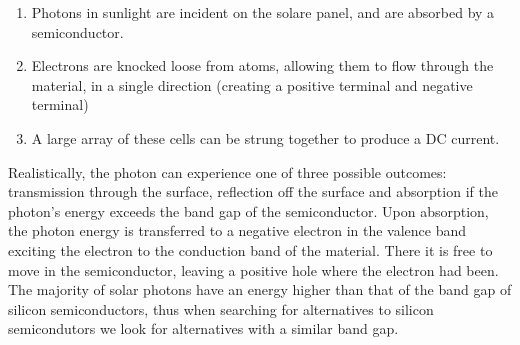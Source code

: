 	\begin{enumerate}
	\item Photons in sunlight are incident on the solare panel, and are absorbed by a semiconductor.
	\item Electrons are knocked loose from atoms, allowing them to flow through the material, in a single direction (creating a positive terminal and negative terminal)
	\item A large array of these cells can be strung together to produce a DC current.
	\end{enumerate}

	Realistically, the photon can experience one of three possible outcomes: transmission through the surface, reflection off the surface and absorption if the photon's energy exceeds the band gap of the semiconductor. Upon absorption, the photon energy is transferred to a negative electron in the valence band exciting the electron to the conduction band of the material. There it is free to move in the semiconductor, leaving a positive hole where the electron had been. The majority of solar photons have an energy higher than that of the band gap of silicon semiconductors, thus when searching for alternatives to silicon semicondutors we look for alternatives with a similar band gap.

	
